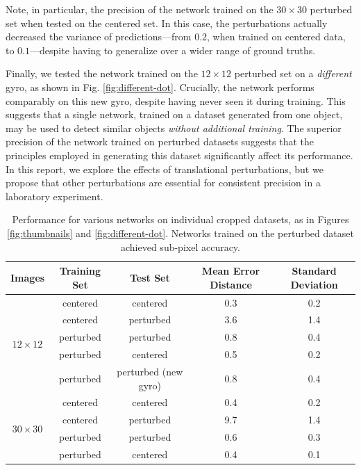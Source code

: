\documentclass[twocolumn, 10pt]{asme2ej}
\begin{document}
Note, in particular, the precision of the network trained on the $30\times 30$
perturbed set when tested on the centered set. In this case, the perturbations
actually decreased the variance of predictions---from $0.2$, when trained on
centered data, to $0.1$---despite having to generalize over a wider range of
ground truths.

Finally, we tested the network trained on the $12 \times 12$ perturbed set on a
\emph{different} gyro, as shown in Fig. \ref{fig:different-dot}. Crucially, the
network performs comparably on this new gyro, despite having never seen it
during training. This suggests that a single network, trained on a dataset
generated from one object, may be used to detect similar objects \emph{without
  additional training}. The superior precision of the network trained on
perturbed datasets suggests that the principles employed in generating this
dataset significantly affect its performance. In this report, we explore the
effects of translational perturbations, but we propose that other perturbations
are essential for consistent precision in a laboratory experiment.

\begin{table}[t]
  \centering
  \begin{tabular}{| c | c | c | c | c |}
    \hline
    Images & Training Set & Test Set & Mean Error Distance & Standard Deviation \\
    \hline
    \multirow{5}{4em}{$12 \times 12$}
                   & centered & centered & 0.3 & 0.2 \\
                   & centered & perturbed & 3.6 & 1.4 \\
                   & perturbed & perturbed & 0.8 & 0.4 \\
                   & perturbed & centered & 0.5 & 0.2 \\
                   & perturbed & perturbed (new gyro) & 0.8 & 0.4 \\
    \hline
    \multirow{4}{4em}{$30 \times 30$}
                   & centered & centered & 0.4 & 0.2 \\
                   & centered & perturbed & 9.7 & 1.4 \\
                   & perturbed & perturbed & 0.6 & 0.3 \\
                   & perturbed & centered & 0.4 & 0.1 \\
    \hline
  \end{tabular}
  \caption{Performance for various networks on individual cropped datasets, as
    in Figures \ref{fig:thumbnails} and \ref{fig:different-dot}. Networks
    trained on the perturbed dataset achieved sub-pixel accuracy.}
  \label{tab:network-performance}
\end{table}
\end{document}
